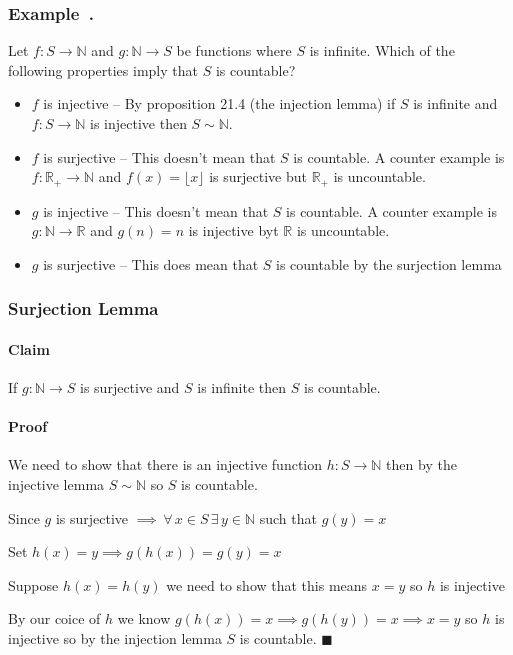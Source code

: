 \documentclass{article}
\newcommand{\bb}[1]{\mathbb{#1}}
\newcommand{\A}{\,\forall\,}
\newcommand{\E}{\,\exists\,}
\newcounter{example}[section]
\newenvironment{example}[1][]{\refstepcounter{example}\vspace{-0.2cm}
\subsubsection*{Example~\thesection.\theexample} \rmfamily}{\par}
\begin{document}
\begin{example}
Let \(f:S\to\bb N\) and \(g:\bb N\to S\) be functions where \(S\) is infinite. Which of the following properties imply that \(S\) is countable?
\begin{itemize}
\item \(f\) is injective -- By proposition 21.4 (the injection lemma) if \(S\) is infinite and \(f:S\to \bb N\) is injective then \(S\sim\bb N\).

\item \(f\) is surjective -- This doesn't mean that \(S\) is countable. A counter example is \(f:\bb R_+\to\bb N\) and \(f(x)=\lfloor x\rfloor\) is surjective but \(\bb R_+\) is uncountable.

\item \(g\) is injective -- This doesn't mean that \(S\) is countable. A counter example is \(g:\bb N\to\bb R\) and \(g(n)=n\) is injective byt \(\bb R\) is uncountable.

\item \(g\) is surjective -- This does mean that \(S\) is countable by the surjection lemma
\end{itemize}
\end{example}

\subsubsection*{Surjection Lemma}

\paragraph{Claim} If \(g:\bb N\to S\) is surjective and \(S\) is infinite then \(S\) is countable.

\paragraph{Proof} We need to show that there is an injective function \(h:S\to\bb N\) then by the injective lemma \(S\sim\bb N\) so \(S\) is countable.

Since \(g\) is surjective \(\implies\A x\in S\E y\in\bb N\) such that \(g(y)=x\)

Set \(h(x)=y\implies g(h(x))=g(y)=x\)

Suppose \(h(x)=h(y)\) we need to show that this means \(x=y\) so \(h\) is injective

By our coice of \(h\) we know \(g(h(x))=x\implies g(h(y))=x\implies x=y\) so \(h\) is injective so by the injection lemma \(S\) is countable. \(\blacksquare\)
\end{document}
